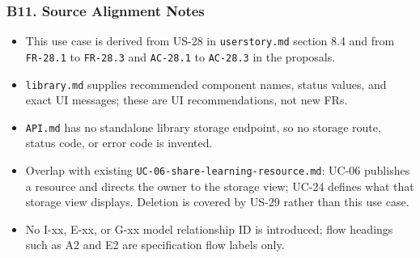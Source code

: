 \documentclass[12pt]{article}
\begin{document}
\hypertarget{sec:b11-source-alignment-notes}{}
\subsubsection*{B11. Source Alignment Notes}
\par\medskip

\begin{itemize}
\item This use case is derived from US-28 in \texttt{userstory.md} section 8.4 and from \texttt{FR-28.1} to \texttt{FR-28.3} and \texttt{AC-28.1} to \texttt{AC-28.3} in the proposals.
\item \texttt{library.md} supplies recommended component names, status values, and exact UI messages; these are UI recommendations, not new FRs.
\item \texttt{API.md} has no standalone library storage endpoint, so no storage route, status code, or error code is invented.
\item Overlap with existing \texttt{UC-06-share-learning-resource.md}: UC-06 publishes a resource and directs the owner to the storage view; UC-24 defines what that storage view displays. Deletion is covered by US-29 rather than this use case.
\item No I-xx, E-xx, or G-xx model relationship ID is introduced; flow headings such as A2 and E2 are specification flow labels only.
\end{itemize}
\par\medskip
\end{document}
